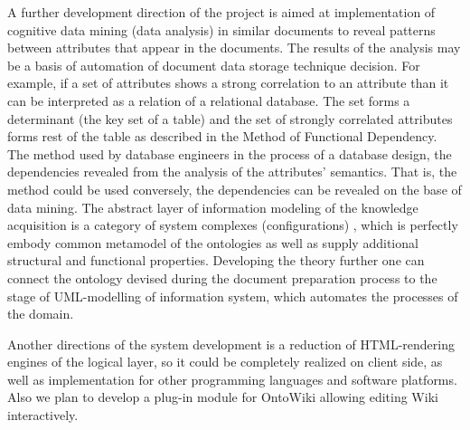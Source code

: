 \documentclass[conference]{IEEEtran}
\begin{document}
A further development direction of the project is aimed at implementation of cognitive data mining (data analysis) in similar documents to reveal patterns between attributes that appear in the documents. The results of the analysis may be a basis of automation of document data storage technique decision. For example, if a set of attributes shows a strong correlation to an attribute than it can be interpreted as a relation of a relational database. The set forms a determinant (the key set of a table) and the set of strongly correlated attributes forms rest of the table as described in the Method of Functional Dependency. The method used by database engineers in the process of a database design, the dependencies revealed from the analysis of the attributes’ semantics. That is, the method could be used conversely, the dependencies can be revealed on the base of data mining.
The abstract layer of information modeling of the knowledge acquisition is a category of system complexes (configurations) \cite{cherk11}, which is perfectly embody common metamodel of the ontologies as well as supply additional structural and functional properties. Developing the theory further one can connect the ontology devised during the document preparation process to the stage of UML-modelling of information system, which automates the processes of the domain.

Another directions of the system development is a reduction of HTML-rendering engines of the logical layer, so it could be completely realized on client side, as well as implementation for other programming languages and software platforms. Also we plan to develop a plug-in module for OntoWiki allowing editing Wiki interactively.






%
%
\end{document}
